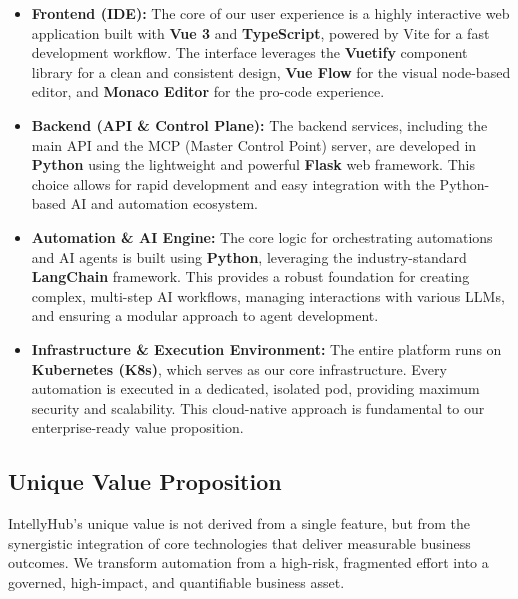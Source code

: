 \begin{itemize}
\item \textbf{Frontend (IDE):} The core of our user experience is a highly interactive web application built with \textbf{Vue 3} and \textbf{TypeScript}, powered by Vite for a fast development workflow. The interface leverages the \textbf{Vuetify} component library for a clean and consistent design, \textbf{Vue Flow} for the visual node-based editor, and \textbf{Monaco Editor} for the pro-code experience.

\item \textbf{Backend (API \& Control Plane):} The backend services, including the main API and the MCP (Master Control Point) server, are developed in \textbf{Python} using the lightweight and powerful \textbf{Flask} web framework. This choice allows for rapid development and easy integration with the Python-based AI and automation ecosystem.

\item \textbf{Automation \& AI Engine:} The core logic for orchestrating automations and AI agents is built using \textbf{Python}, leveraging the industry-standard \textbf{LangChain} framework. This provides a robust foundation for creating complex, multi-step AI workflows, managing interactions with various LLMs, and ensuring a modular approach to agent development.

\item \textbf{Infrastructure \& Execution Environment:} The entire platform runs on \textbf{Kubernetes (K8s)}, which serves as our core infrastructure. Every automation is executed in a dedicated, isolated pod, providing maximum security and scalability. This cloud-native approach is fundamental to our enterprise-ready value proposition.
\end{itemize}

\subsection{Unique Value Proposition}
IntellyHub's unique value is not derived from a single feature, but from the synergistic integration of core technologies that deliver measurable business outcomes. We transform automation from a high-risk, fragmented effort into a governed, high-impact, and quantifiable business asset.

